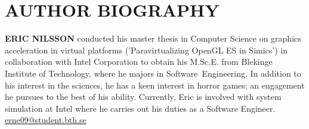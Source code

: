 
\section{AUTHOR BIOGRAPHY}
\label{sec:authorbiography}
\textbf{ERIC NILSSON} conducted his master thesis in Computer Science on graphics acceleration in virtual platforms ('Paravirtualizing OpenGL ES in Simics') in collaboration with Intel Corporation to obtain his M.Sc.E. from Blekinge Institute of Technology, where he majors in Software~Engineering.
In addition to his interest in the sciences, he has a keen interest in horror games; an engagement he pursues to the best of his ability.
Currently, Eric is involved with system simulation at Intel where he carries out his duties as a Software Engineer.\\

\href{mailto:erne09@student.bth.se}{erne09@student.bth.se}
